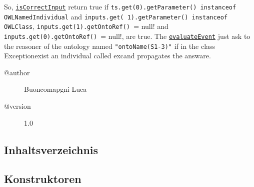  So, \texttt{\hyperlink{ontologyFramework.OFEventManagement.OFLogicalEventManagement.OFEventImplementation.IsInClass.isCorrectInput(java.util.List<ontologyFramework.OFEventManagement.EventComputedData>)}{isCorrectInput}} return true if \verb!ts.get(0).getParameter() instanceof OWLNamedIndividual!
 and \verb!inputs.get( 1).getParameter() instanceof OWLClass!, \verb!inputs.get(1).getOntoRef() != null! and \verb!inputs.get(0).getOntoRef() != null!, are true.
 The \texttt{\hyperlink{ontologyFramework.OFEventManagement.OFLogicalEventManagement.OFEventImplementation.IsInClass.evaluateEvent(java.util.List<ontologyFramework.OFEventManagement.EventComputedData>,ontologyFramework.OFRunning.OFInvokingManager.OFBuildedListInvoker)}{evaluateEvent}} just ask to the reasoner of the ontology named
 \verb!"ontoName(S1-3)"! if in the class \textquotedbl Exception\textquotedbl  exist an individual called \textquotedbl exc\textquotedbl  and propagates the
 answare.
\begin{description}
\item[@author] 
Buoncomapgni Luca
\item[@version] 
1.0
\end{description}
\subsection{Inhaltsverzeichnis}
\subsection{Konstruktoren}
\begin{description}
\item[{\label{ontologyFramework.OFEventManagement.OFLogicalEventManagement.OFEventImplementation.IsInClass()}}]
~ 
\end{description}
